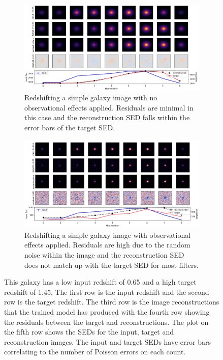 \documentclass[fleqn,usenatbib]{mnras}
\begin{document}
\begin{figure}
    \begin{subfigure}[b]{2\columnwidth}
        \centering
	    \includegraphics[width=\columnwidth]{Figures/standard-low-high.png}
        \caption{Redshifting a simple galaxy image with no observational effects applied. Residuals are minimal in this case and the reconstruction SED falls within the error bars of the target SED.}
        \label{fig:standard-low-high}
    \end{subfigure}
    
    \begin{subfigure}[b]{2\columnwidth}
        \centering
	    \includegraphics[width=\columnwidth]{Figures/noisy-low-high.png}
        \caption{Redshifting a simple galaxy image with observational effects applied. Residuals are high due to the random noise within the image and the reconstruction SED does not match up with the target SED for most filters.}
        \label{fig:noisy-low-high}
    \end{subfigure}

    \caption{This galaxy has a low input redshift of 0.65 and a high target redshift of 1.45. The first row is the input redshift and the second row is the target redshift. The third row is the image reconstructions that the trained model has produced with the fourth row showing the residuals between the target and reconstructions. The plot on the fifth row shows the SEDs for the input, target and reconstruction images. The input and target SEDs have error bars correlating to the number of Poisson errors on each count.}
    \label{fig:simple galaxy results plots redshifting}
\end{figure}
\end{document}
